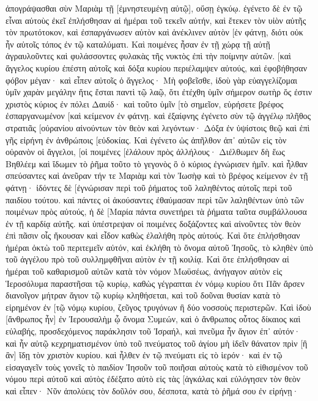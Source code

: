 ἀπογράψασθαι σὺν Μαριὰμ τῇ [ἐμνηστευμένῃ αὐτῷ], οὔσῃ ἐγκύῳ. 
ἐγένετο δὲ ἐν τῷ εἶναι αὐτοὺς ἐκεῖ ἐπλήσθησαν αἱ ἡμέραι τοῦ τεκεῖν αὐτήν, 
καὶ ἔτεκεν τὸν υἱὸν αὐτῆς τὸν πρωτότοκον, καὶ ἐσπαργάνωσεν αὐτὸν καὶ ἀνέκλινεν αὐτὸν [ἐν φάτνῃ, διότι οὐκ ἦν αὐτοῖς τόπος ἐν τῷ καταλύματι. 
Καὶ ποιμένες ἦσαν ἐν τῇ χώρᾳ τῇ αὐτῇ ἀγραυλοῦντες καὶ φυλάσσοντες φυλακὰς τῆς νυκτὸς ἐπὶ τὴν ποίμνην αὐτῶν. 
[καὶ ἄγγελος κυρίου ἐπέστη αὐτοῖς καὶ δόξα κυρίου περιέλαμψεν αὐτούς, καὶ ἐφοβήθησαν φόβον μέγαν· 
καὶ εἶπεν αὐτοῖς ὁ ἄγγελος· Μὴ φοβεῖσθε, ἰδοὺ γὰρ εὐαγγελίζομαι ὑμῖν χαρὰν μεγάλην ἥτις ἔσται παντὶ τῷ λαῷ, 
ὅτι ἐτέχθη ὑμῖν σήμερον σωτὴρ ὅς ἐστιν χριστὸς κύριος ἐν πόλει Δαυίδ· 
καὶ τοῦτο ὑμῖν [τὸ σημεῖον, εὑρήσετε βρέφος ἐσπαργανωμένον [καὶ κείμενον ἐν φάτνῃ. 
καὶ ἐξαίφνης ἐγένετο σὺν τῷ ἀγγέλῳ πλῆθος στρατιᾶς [οὐρανίου αἰνούντων τὸν θεὸν καὶ λεγόντων· 
Δόξα ἐν ὑψίστοις θεῷ καὶ ἐπὶ γῆς εἰρήνη ἐν ἀνθρώποις [εὐδοκίας. 
Καὶ ἐγένετο ὡς ἀπῆλθον ἀπ᾽ αὐτῶν εἰς τὸν οὐρανὸν οἱ ἄγγελοι, [οἱ ποιμένες [ἐλάλουν πρὸς ἀλλήλους· Διέλθωμεν δὴ ἕως Βηθλέεμ καὶ ἴδωμεν τὸ ῥῆμα τοῦτο τὸ γεγονὸς ὃ ὁ κύριος ἐγνώρισεν ἡμῖν. 
καὶ ἦλθαν σπεύσαντες καὶ ἀνεῦραν τήν τε Μαριὰμ καὶ τὸν Ἰωσὴφ καὶ τὸ βρέφος κείμενον ἐν τῇ φάτνῃ· 
ἰδόντες δὲ [ἐγνώρισαν περὶ τοῦ ῥήματος τοῦ λαληθέντος αὐτοῖς περὶ τοῦ παιδίου τούτου. 
καὶ πάντες οἱ ἀκούσαντες ἐθαύμασαν περὶ τῶν λαληθέντων ὑπὸ τῶν ποιμένων πρὸς αὐτούς, 
ἡ δὲ [Μαρία πάντα συνετήρει τὰ ῥήματα ταῦτα συμβάλλουσα ἐν τῇ καρδίᾳ αὐτῆς. 
καὶ ὑπέστρεψαν οἱ ποιμένες δοξάζοντες καὶ αἰνοῦντες τὸν θεὸν ἐπὶ πᾶσιν οἷς ἤκουσαν καὶ εἶδον καθὼς ἐλαλήθη πρὸς αὐτούς. 
Καὶ ὅτε ἐπλήσθησαν ἡμέραι ὀκτὼ τοῦ περιτεμεῖν αὐτόν, καὶ ἐκλήθη τὸ ὄνομα αὐτοῦ Ἰησοῦς, τὸ κληθὲν ὑπὸ τοῦ ἀγγέλου πρὸ τοῦ συλλημφθῆναι αὐτὸν ἐν τῇ κοιλίᾳ. 
Καὶ ὅτε ἐπλήσθησαν αἱ ἡμέραι τοῦ καθαρισμοῦ αὐτῶν κατὰ τὸν νόμον Μωϋσέως, ἀνήγαγον αὐτὸν εἰς Ἱεροσόλυμα παραστῆσαι τῷ κυρίῳ, 
καθὼς γέγραπται ἐν νόμῳ κυρίου ὅτι Πᾶν ἄρσεν διανοῖγον μήτραν ἅγιον τῷ κυρίῳ κληθήσεται, 
καὶ τοῦ δοῦναι θυσίαν κατὰ τὸ εἰρημένον ἐν [τῷ νόμῳ κυρίου, ζεῦγος τρυγόνων ἢ δύο νοσσοὺς περιστερῶν. 
Καὶ ἰδοὺ [ἄνθρωπος ἦν] ἐν Ἰερουσαλὴμ ᾧ ὄνομα Συμεών, καὶ ὁ ἄνθρωπος οὗτος δίκαιος καὶ εὐλαβής, προσδεχόμενος παράκλησιν τοῦ Ἰσραήλ, καὶ πνεῦμα ἦν ἅγιον ἐπ᾽ αὐτόν· 
καὶ ἦν αὐτῷ κεχρηματισμένον ὑπὸ τοῦ πνεύματος τοῦ ἁγίου μὴ ἰδεῖν θάνατον πρὶν [ἢ ἂν] ἴδῃ τὸν χριστὸν κυρίου. 
καὶ ἦλθεν ἐν τῷ πνεύματι εἰς τὸ ἱερόν· καὶ ἐν τῷ εἰσαγαγεῖν τοὺς γονεῖς τὸ παιδίον Ἰησοῦν τοῦ ποιῆσαι αὐτοὺς κατὰ τὸ εἰθισμένον τοῦ νόμου περὶ αὐτοῦ 
καὶ αὐτὸς ἐδέξατο αὐτὸ εἰς τὰς [ἀγκάλας καὶ εὐλόγησεν τὸν θεὸν καὶ εἶπεν· 
Νῦν ἀπολύεις τὸν δοῦλόν σου, δέσποτα, κατὰ τὸ ῥῆμά σου ἐν εἰρήνῃ· 

